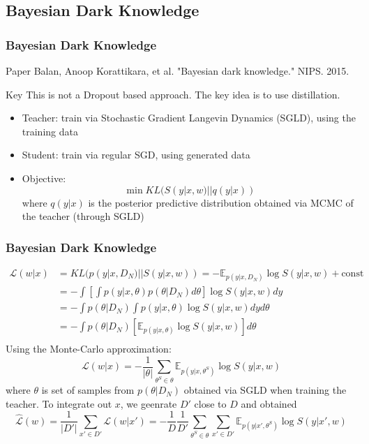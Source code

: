 \documentclass{beamer}
\begin{document}
\subsection{Bayesian Dark Knowledge}

\begin{frame}
\frametitle{Bayesian Dark Knowledge}
\begin{block}{Paper}
Balan, Anoop Korattikara, et al. "Bayesian dark knowledge." NIPS. 2015.
\end{block}

\begin{block}{Key}
This is not a Dropout based approach. The key idea is to use distillation.
\begin{itemize}
\setlength\itemsep{0em}
\item Teacher: train via Stochastic Gradient Langevin Dynamics (SGLD), using the training data
\item Student: train via regular SGD, using generated data
\item Objective:
\[
\min KL(S(y|x,w) || q(y|x))
\]
where $q(y|x)$ is the posterior predictive distribution obtained via MCMC of the teacher (through SGLD)
\end{itemize}
\end{block}

\end{frame}

\begin{frame}
\frametitle{Bayesian Dark Knowledge}
\vspace{-0.2in}
\[
\begin{split}
\mathcal{L}(w|x) &= KL(p(y|x, D_N)||S(y|x,w)) = -\mathbb{E}_{p(y|x, D_N)}\log S(y|x,w) + \text{const} \\
&= -\int[\int p(y|x,\theta)p(\theta|D_N) d\theta] \log S(y|x,w) dy \\
&= -\int p(\theta|D_N) \int p(y|x,\theta) \log S(y|x,w) dy d\theta \\
&= -\int p(\theta|D_N) [\mathbb{E}_{p(y|x,\theta)} \log S(y|x,w)] d\theta \\
\end{split}
\]
Using the Monte-Carlo approximation:
\[
\mathcal{L}(w|x) = -\frac{1}{|\theta|} \sum_{\theta^S \in \theta} \mathbb{E}_{p(y|x, \theta^S)} \log S(y|x,w)
\]
where $\theta$ is set of samples from $p(\theta|D_N)$ obtained via SGLD when training the teacher.
To integrate out $x$, we geenrate $D'$ close to $D$ and obtained
\[
\hat{\mathcal{L}}(w) = \frac{1}{|D'|}\sum_{x' \in D'} \mathcal{L}(w|x') = - \frac{1}{D}\frac{1}{D'}\sum_{\theta^S \in \theta} \sum_{x'\in D'} \mathbb{E}_{p(y|x',\theta^S)} \log S(y|x', w)
\]

\end{frame}
\end{document}
